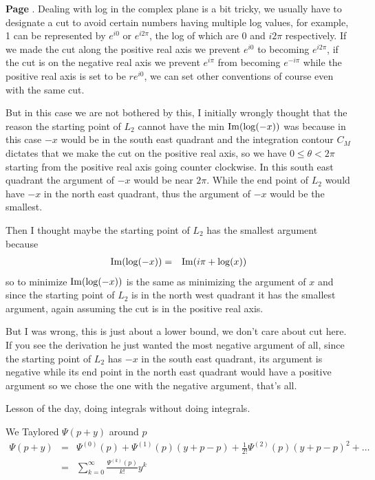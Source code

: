 \documentclass[aps,preprint,preprintnumbers,nofootinbib,showpacs,prd]{revtex4-1}
\newcommand{\nbea}{\begin{eqnarray*}}
\newcommand{\neea}{\end{eqnarray*}}
\def\Im{{\rm Im}}
\begin{document}
{\bf Page }. Dealing with log in the complex plane is a bit tricky, we usually have to designate a cut to avoid certain numbers having multiple log values, for example, 1 can be represented by $e^{i0}$ or $e^{i2\pi}$, the log of which are $0$ and $i 2\pi$ respectively. If we made the cut along the positive real axis we prevent $e^{i0}$ to becoming $e^{i2\pi}$, if the cut is on the negative real axis we prevent $e^{i\pi}$ from becoming $e^{-i\pi}$ while the positive real axis is set to be $r e^{i0}$, we can set other conventions of course even with the same cut.

But in this case we are not bothered by this, I initially wrongly thought that the reason the starting point of $L_2$ cannot have the min $\Im(\log(-x))$ was because in this case $-x$ would be in the south east quadrant and the integration contour $C_M$ dictates that we make the cut on the positive real axis, so we have $0 \le \theta < 2\pi$ starting from the positive real axis going counter clockwise. In this south east quadrant the argument of $-x$ would be near $2\pi$. While the end point of $L_2$ would have $-x$ in the north east quadrant, thus the argument of $-x$ would be the smallest.

Then I thought maybe the starting point of $L_2$ has the smallest argument because
%
\nbea
\Im{(\log(-x))} & = & \Im{(i\pi + \log(x))}
\neea
%
so to minimize $\Im(\log(-x))$ is the same as minimizing the argument of $x$ and since the starting point of $L_2$ is in the north west quadrant it has the smallest argument, again assuming the cut is in the positive real axis.

But I was wrong, this is just about a lower bound, we don't care about cut here. If you see the derivation he just wanted the most negative argument of all, since the starting point of $L_2$ has $-x$ in the south east quadrant, its argument is negative while its end point in the north east quadrant would have a positive argument so we chose the one with the negative argument, that's all.










Lesson of the day, doing integrals without doing integrals.


We Taylored $\Psi(p+y)$ around $p$
%
\nbea
\Psi(p+y) & = & \Psi^{(0)}(p) + \Psi^{(1)}(p) (y+p - p) + \frac{1}{2!}\Psi^{(2)}(p) (y+p - p)^2 + \dots \\
& = & \sum_{k=0}^\infty \frac{\Psi^{(k)}(p)}{k!} y^k
\neea
%
\end{document}
